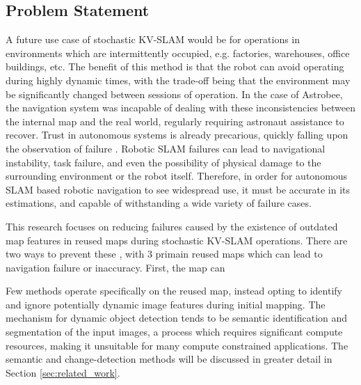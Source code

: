 \subsection{Problem Statement}

A future use case of stochastic KV-SLAM would be for operations in environments which are intermittently occupied, e.g. factories, warehouses, office buildings, etc. The benefit of this method is that the robot can avoid operating during highly dynamic times, with the trade-off being that the environment may be significantly changed between sessions of operation. In the case of Astrobee, the navigation system was incapable of dealing with these inconsistencies between the internal map and the real world, regularly requiring astronaut assistance to recover. Trust in autonomous systems is already precarious, quickly falling upon the observation of failure \cite{robinetteEffectRobotPerformance2017}. Robotic SLAM failures can lead to navigational instability, task failure, and even the possibility of physical damage to the surrounding environment or the robot itself\cite{nahavandiComprehensiveReviewAutonomous2025a}. Therefore, in order for autonomous SLAM based robotic navigation to see widespread use, it must be accurate in its estimations, and capable of withstanding a wide variety of failure cases.

This research focuses on reducing failures caused by the existence of outdated map features in reused maps during stochastic KV-SLAM operations. There are two ways to prevent these , with 3 primain reused maps which can lead to navigation failure or inaccuracy. First, the map can 

Few methods operate specifically on the reused map, instead opting to identify and ignore potentially dynamic image features during initial mapping. The mechanism for dynamic object detection tends to be semantic identification and segmentation of the input images, a process which requires significant compute resources, making it unsuitable for many compute constrained applications. The semantic and change-detection methods will be discussed in greater detail in Section \ref{sec:related_work}.

